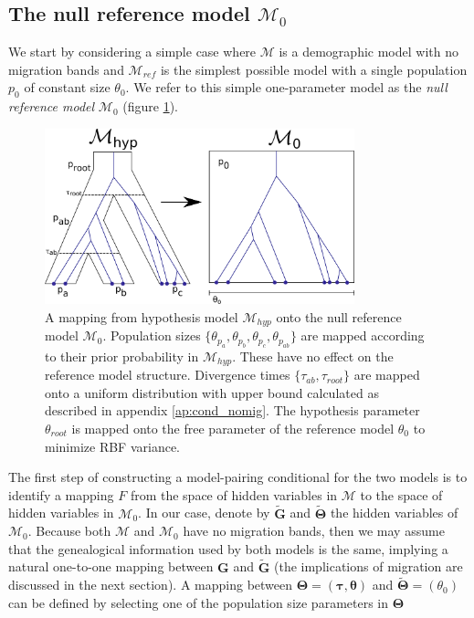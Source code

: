 \documentclass[11pt]{article}
\newcommand{\vect}[1]{\boldsymbol{\mathbf{#1}}}
\newcommand{\M}{\mathcal{M}}
\newcommand{\G}{\vect{G}}
\newcommand{\T}{\vect{\Theta}}
\newcommand{\Mref}{\M_{ref}}
\newcommand{\Gref}{\widetilde{\G}}
\newcommand{\Tref}{\widetilde{\T}}
\newcommand{\1}{\mathbbm{1}}
\newcommand{\taus}{\vect\tau}
\newcommand{\thetas}{\vect\theta}
\begin{document}
\subsection{The null reference model $\M_0$}
\label{The null reference model}
We start by considering a simple case where $\M$ is a demographic model with no migration bands and $\Mref$ is the simplest possible model with a single population $p_0$ of constant size $\theta_0$.
%
We refer to this simple one-parameter model as the {\em null reference model} $\M_0$ (figure \ref{fig:null_reference_model_no_migration}).
%
\begin{figure}[h]
\centering
\includegraphics[width=0.8\textwidth]
{null_reference_model_no_migration}
\captionsetup{width=.8\textwidth}
\caption{A mapping from hypothesis model $\M_{hyp}$ onto the null reference model $\M_0$. Population sizes $\{\theta_{p_a}, \theta_{p_b}, \theta_{p_c}, \theta_{p_{ab}}\}$ are mapped according to their prior probability in $\M_{hyp}$. These have no effect on the reference model structure. Divergence times $\{\tau_{ab}, \tau_{root}\}$ are mapped onto a uniform distribution with upper bound calculated as described in appendix \ref{ap:cond_nomig}. The  hypothesis parameter $\theta_{root}$ is mapped onto the free parameter of the reference model $\theta_0$ to minimize RBF variance.}
\label{fig:null_reference_model_no_migration}
\end{figure}
%
The first step of constructing a model-pairing conditional for the two models is to identify a mapping $F$ from the space
of hidden variables in $\M$ to the space of hidden variables in $\M_0$.
%
In our case, denote by $\Gref$ and $\Tref$ the hidden variables of $\M_0$.
%
Because both $\M$ and $\M_0$ have no migration bands, then we may assume that the genealogical information used
by both models is the same, implying a natural one-to-one mapping between $\G$ and $\Gref$ (the implications of migration are discussed in the next section).
%
A mapping between $\T=(\taus,\thetas)$ and $\Tref=(\theta_0)$ can be defined by selecting one of the population size parameters in $\T$
\end{document}
